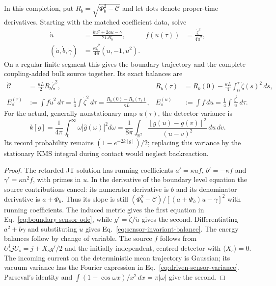 \begin{proposition}
\label{prop:driven-boundary-sensor}
In this completion, put $R_b=\sqrt{\Phi_b^2-\mathcal C}$ and let dots denote
proper-time derivatives. Starting with the matched coefficient data, solve
\begin{align}
 \dot u&=\frac{bu^2+2au-\gamma}{2LR_b},&
 f(u(\tau))&=\frac{\dot\zeta^2}{4\dot u^2},\nonumber\\
 (\dot a,\dot b,\dot\gamma)&=
       \frac{\kappa\dot\zeta^2}{4\dot u}(u,-1,u^2).
 \label{eq:boundary-sensor-ode}
\end{align}
On a regular finite segment this gives the boundary trajectory and the complete
coupling-added bulk source together. Its exact balances are
\begin{align}
 \dot{\mathcal C}&=\frac{\kappa L}{2}R_b\dot\zeta^2,&
 R_b(\tau)&=R_b(0)-\frac{\kappa L}{4}
               \int_0^\tau\dot\zeta(s)^2\,ds,\label{eq:sensor-invariant-balance}\\
 E_s^{(\tau)}&:=\int f\dot u^2\,d\tau
       =\frac14\int\dot\zeta^2\,d\tau
       =\frac{R_b(0)-R_b(\tau_f)}{\kappa L},&
 E_s^{(u)}&:=\int f\,du
       =\frac14\int\frac{\dot\zeta^2}{\dot u}\,d\tau.
 \label{eq:sensor-energy-balance}
\end{align}
For the actual, generally nonstationary map $u(\tau)$, the detector variance is
\begin{equation}\label{eq:driven-sensor-variance}
 k[g]=\frac{1}{4\pi}\int_0^\infty\omega|\widehat g(\omega)|^2d\omega
     =\frac{1}{8\pi}\int_{\mathbb R^2}
       \frac{[g(u)-g(v)]^2}{(u-v)^2}\,du\,dv.
\end{equation}
Its record probability remains $(1-e^{-2k[g]})/2$; replacing this variance by
the stationary KMS integral during contact would neglect backreaction.
\end{proposition}
\begin{proof}
The retarded JT solution has running coefficients
$a'=\kappa u f$, $b'=-\kappa f$ and $\gamma'=\kappa u^2 f$, with primes in
$u$. In the derivative of the boundary level equation the source contributions
cancel: its numerator derivative is $b$ and its denominator derivative is
$a+\Phi_b$. Thus its slope is still
$(\Phi_b^2-\mathcal C)/[(a+\Phi_b)u-\gamma]^2$ with running coefficients.
The induced metric gives the first equation in
Eq.~\eqref{eq:boundary-sensor-ode}, while $g'=\dot\zeta/\dot u$ gives the
second. Differentiating $a^2+b\gamma$ and substituting $\dot u$ gives
Eq.~\eqref{eq:sensor-invariant-balance}. The energy balances follow by change
of variable. The source $f$ follows from $U_s^\dagger jU_s=j+X_sg'/2$ and
the initially independent, centred detector with $\langle X_s\rangle=0$.
The incoming current on the deterministic mean trajectory is Gaussian; its
vacuum variance has the Fourier expression in
Eq.~\eqref{eq:driven-sensor-variance}. Parseval's
identity and $\int(1-\cos\omega x)/x^2\,dx=\pi|\omega|$ give the second.
\end{proof}
